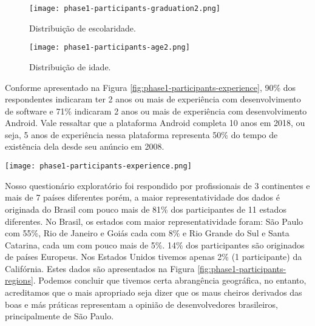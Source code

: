 \begin{figure*}[!htb]
\centering
\begin{subfigure}{.44\textwidth}
  \centering
  \texttt{[image: phase1-participants-graduation2.png]}
  \caption{Distribuição de escolaridade.}
  \label{fig:phase1-participants-graduation}
\end{subfigure}
\begin{subfigure}{.54\textwidth}
  \centering
  \texttt{[image: phase1-participants-age2.png]}
  \caption{Distribuição de idade.}
  \label{fig:phase1-participants-age}
\end{subfigure}%
\caption{Escolaridade e distribuição de idade dos participantes em S$_1$.}
\label{fig:phase1-participants-infos}
\end{figure*}

Conforme apresentado na Figura \ref{fig:phase1-participants-experience}, 90\% dos respondentes indicaram ter 2 anos ou mais de experiência com desenvolvimento de software e 71\% indicaram 2 anos ou mais de experiência com desenvolvimento Android. Vale ressaltar que a plataforma Android completa 10 anos em 2018, ou seja, 5 anos de experiência nessa plataforma representa 50\% do tempo de existência dela desde seu anúncio em 2008. 


\begin{figure*}[!htb]
\centering
\texttt{[image: phase1-participants-experience.png]}
\caption{Tempo de experiência com desenvolvimento de software e desenvolvimento Android dos participantes de S$_1$.}
\label{fig:phase1-participants-experience}
\end{figure*}


Nosso questionário exploratório foi respondido por profissionais de 3 continentes e mais de 7 países diferentes porém, a maior representatividade dos dados é originada do Brasil com pouco mais de 81\% dos participantes de 11 estados diferentes. No Brasil, os estados com maior representatividade foram: São Paulo com 55\%, Rio de Janeiro e Goiás cada com 8\% e Rio Grande do Sul e Santa Catarina, cada um com pouco mais de 5\%. 14\% dos participantes são originados de países Europeus. Nos Estados Unidos tivemos apenas 2\% (1 participante) da Califórnia. Estes dados são apresentados na Figura \ref{fig:phase1-participants-regions}. Podemos concluir que tivemos certa abrangência geográfica, no entanto, acreditamos que o mais apropriado seja dizer que os maus cheiros derivados das boas e más práticas representam a opinião de desenvolvedores brasileiros, principalmente de São Paulo.

